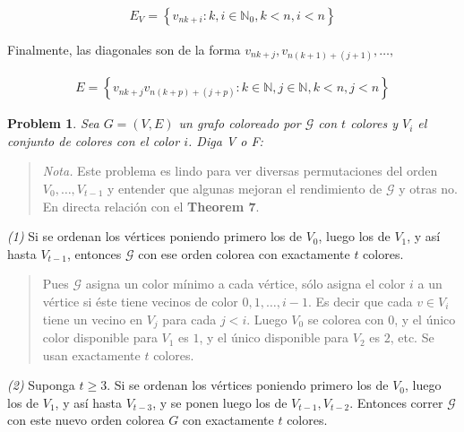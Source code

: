 \documentclass[a4paper]{article}
\newtheorem{problem}{Problem}
\newtheorem{problem}{Problem}
\begin{document}
\begin{align*}
    E_V = \left\{ v_{nk + i} : k, i \in \mathbb{N}_0, k < n, i < n \right\} 
\end{align*}

Finalmente, las diagonales son de la forma $v_{nk + j}, v_{n(k+1) + (j + 1)},
\ldots , $

\begin{align*}
    E = \left\{ v_{nk + j}v_{n(k+p) + (j + p)} : k \in \mathbb{N}, j \in
    \mathbb{N}, k < n, j < n \right\} 
\end{align*}

\pagebreak 

\begin{problem}
    Sea $G = (V, E) $ un grafo coloreado por $\mathscr{G}$ con $t$ colores y $V_i$ el
    conjunto de colores con el color $i$. Diga V o F:
\end{problem}


\small
\begin{quote}

\textit{Nota.} Este problema es lindo para ver diversas permutaciones del orden
$V_0, \ldots, V_{t - 1}$ y entender que algunas mejoran el rendimiento de $\mathscr{G}$
y otras no. En directa relación con el \textbf{Theorem 7}.

\end{quote}
\normalsize


\textit{(1)} Si se ordenan los vértices poniendo primero los de $V_0$, luego los
de $V_1$, y así hasta $V_{t-1}$, entonces $\mathscr{G}$ con ese orden colorea con
exactamente $t$ colores. 

\small
\begin{quote}
    Pues $\mathscr{G}$ asigna un color mínimo a cada vértice, sólo asigna el color $i$
    a un vértice si éste tiene vecinos de color $0, 1, \ldots, i -1$. Es decir
    que cada $v \in V_i$ tiene un vecino en $V_j$ para cada $j < i$. Luego $V_0$
    se colorea con $0$, y el único color disponible para $V_1$ es $1$, y el
    único disponible para $V_2$ es $2$, etc. Se usan exactamente $t$ colores.
\end{quote}


\textit{(2)} Suponga $t \geq 3$. Si se ordenan los vértices poniendo primero los
de $V_0$, luego los de $V_1$, y así hasta $V_{t - 3}$, y se ponen luego los de
$V_{t - 1}, V_{t-2}$. Entonces correr $\mathscr{G}$ con este nuevo orden colorea $G$
con exactamente $t$ colores.
\end{document}
